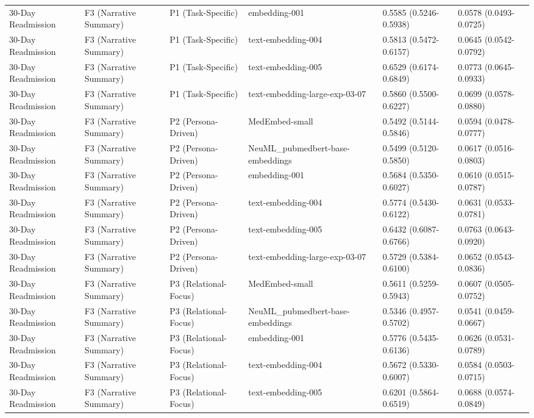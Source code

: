 \documentclass[border=0pt]{standalone}
\begin{document}
\begin{adjustbox}{width=\textwidth}
\begin{tabular}{llllll}
30-Day Readmission & F3 (Narrative Summary) & P1 (Task-Specific) & embedding-001 & 0.5585 (0.5246-0.5938) & 0.0578 (0.0493-0.0725) \\
30-Day Readmission & F3 (Narrative Summary) & P1 (Task-Specific) & text-embedding-004 & 0.5813 (0.5472-0.6157) & 0.0645 (0.0542-0.0792) \\
30-Day Readmission & F3 (Narrative Summary) & P1 (Task-Specific) & text-embedding-005 & 0.6529 (0.6174-0.6849) & 0.0773 (0.0645-0.0933) \\
30-Day Readmission & F3 (Narrative Summary) & P1 (Task-Specific) & text-embedding-large-exp-03-07 & 0.5860 (0.5500-0.6227) & 0.0699 (0.0578-0.0880) \\
30-Day Readmission & F3 (Narrative Summary) & P2 (Persona-Driven) & MedEmbed-small & 0.5492 (0.5144-0.5846) & 0.0594 (0.0478-0.0777) \\
30-Day Readmission & F3 (Narrative Summary) & P2 (Persona-Driven) & NeuML\_pubmedbert-base-embeddings & 0.5499 (0.5120-0.5850) & 0.0617 (0.0516-0.0803) \\
30-Day Readmission & F3 (Narrative Summary) & P2 (Persona-Driven) & embedding-001 & 0.5684 (0.5350-0.6027) & 0.0610 (0.0515-0.0787) \\
30-Day Readmission & F3 (Narrative Summary) & P2 (Persona-Driven) & text-embedding-004 & 0.5774 (0.5430-0.6122) & 0.0631 (0.0533-0.0781) \\
30-Day Readmission & F3 (Narrative Summary) & P2 (Persona-Driven) & text-embedding-005 & 0.6432 (0.6087-0.6766) & 0.0763 (0.0643-0.0920) \\
30-Day Readmission & F3 (Narrative Summary) & P2 (Persona-Driven) & text-embedding-large-exp-03-07 & 0.5729 (0.5384-0.6100) & 0.0652 (0.0543-0.0836) \\
30-Day Readmission & F3 (Narrative Summary) & P3 (Relational-Focus) & MedEmbed-small & 0.5611 (0.5259-0.5943) & 0.0607 (0.0505-0.0752) \\
30-Day Readmission & F3 (Narrative Summary) & P3 (Relational-Focus) & NeuML\_pubmedbert-base-embeddings & 0.5346 (0.4957-0.5702) & 0.0541 (0.0459-0.0667) \\
30-Day Readmission & F3 (Narrative Summary) & P3 (Relational-Focus) & embedding-001 & 0.5776 (0.5435-0.6136) & 0.0626 (0.0531-0.0789) \\
30-Day Readmission & F3 (Narrative Summary) & P3 (Relational-Focus) & text-embedding-004 & 0.5672 (0.5330-0.6007) & 0.0584 (0.0503-0.0715) \\
30-Day Readmission & F3 (Narrative Summary) & P3 (Relational-Focus) & text-embedding-005 & 0.6201 (0.5864-0.6519) & 0.0688 (0.0574-0.0849) \\

\end{tabular}
\end{adjustbox}
\end{document}
